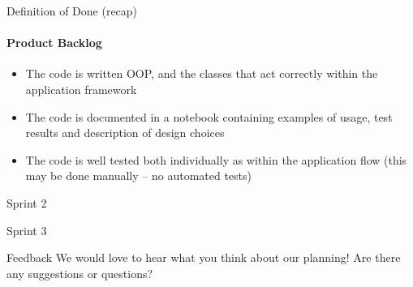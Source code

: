\begin{frame}[t]{Definition of Done (recap)}
\framesubtitle{Product Backlog}

\begin{itemize}
	\item  The code is written OOP, and the classes that act correctly within the application framework
	\item The code is documented in a notebook containing examples of usage, test results and description of design choices 
	\item The code is well tested both individually as within the application flow (this may be done manually – no automated tests)
\end{itemize}
\end{frame}

\begin{frame}[t]{Sprint 2}

\end{frame}

\begin{frame}[t]{Sprint 3}

\end{frame}

\begin{frame}[t]{Feedback}
We would love to hear what you think about our planning! Are there any suggestions or questions?
\end{frame}
